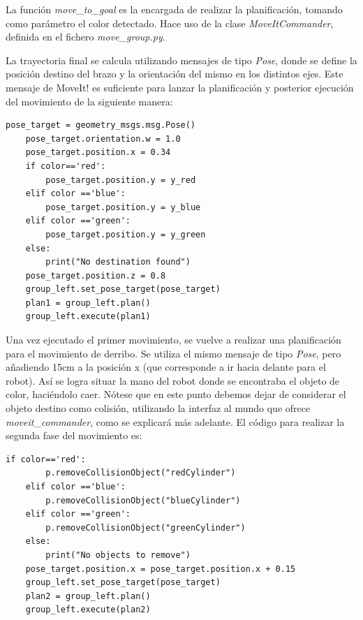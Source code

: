 \documentclass[12pt,spanish,chapterprefix, numbers=noenddot]{book}
\numberwithin{equation}{section}
\numberwithin{figure}{section}
\begin{document}
La función \textit{move\_to\_goal} es la encargada de realizar la planificación, tomando como parámetro el color detectado.
Hace uso de la clase \textit{MoveItCommander}, definida en el fichero \textit{move\_group.py}.  
	
La trayectoria final se calcula utilizando mensajes de tipo \textit{Pose}, donde se define la posición destino del brazo y la orientación del mismo en los distintos ejes. Este mensaje de MoveIt! es suficiente para lanzar la planificación y posterior ejecución del movimiento de la siguiente manera: 
\vspace{20pt}
	\begin{lstlisting}[frame=single] 
    pose_target = geometry_msgs.msg.Pose()
    pose_target.orientation.w = 1.0
    pose_target.position.x = 0.34 
    if color=='red':
        pose_target.position.y = y_red
    elif color =='blue':
        pose_target.position.y = y_blue
    elif color =='green':
        pose_target.position.y = y_green
    else:
        print("No destination found")
    pose_target.position.z = 0.8 
    group_left.set_pose_target(pose_target)
    plan1 = group_left.plan()
    group_left.execute(plan1)
	\end{lstlisting}

Una vez ejecutado el primer movimiento, se vuelve a realizar una planificación para el movimiento de derribo. Se utiliza el mismo mensaje de tipo \textit{Pose}, pero añadiendo 15cm a la posición x (que corresponde a ir hacia delante para el robot). Así se logra situar la mano del robot donde se encontraba el objeto de color, haciéndolo caer. Nótese que en este punto debemos dejar de considerar el objeto destino como colisión, utilizando la interfaz al mundo que ofrece \textit{moveit\_commander}, como se explicará más adelante. El código para realizar la segunda fase del  movimiento es:
\vspace{20pt}
	\begin{lstlisting}[frame=single] 
    if color=='red':
        p.removeCollisionObject("redCylinder")
    elif color =='blue':
        p.removeCollisionObject("blueCylinder")
    elif color =='green':
        p.removeCollisionObject("greenCylinder")
    else:
        print("No objects to remove")
    pose_target.position.x = pose_target.position.x + 0.15
    group_left.set_pose_target(pose_target)
    plan2 = group_left.plan()
    group_left.execute(plan2)
	\end{lstlisting}
	
\end{document}
